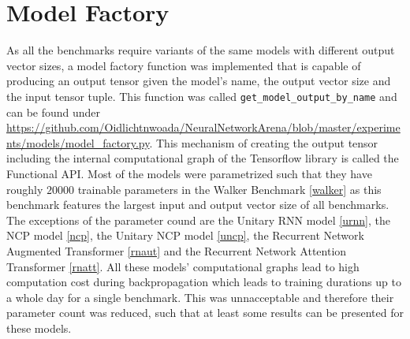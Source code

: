 \documentclass[draft,final]{vutinfth} %
\begin{document}
    \section{Model Factory}
    As all the benchmarks require variants of the same models with different output vector sizes, a model factory function was implemented that is capable of producing an output tensor given the model's name, the output vector size and the input tensor tuple.
    This function was called \texttt{get\_model\_output\_by\_name} and can be found under \url{https://github.com/Oidlichtnwoada/NeuralNetworkArena/blob/master/experiments/models/model_factory.py}.
    This mechanism of creating the output tensor including the internal computational graph of the Tensorflow library \cite{Tensorflow} is called the Functional API.
    Most of the models were parametrized such that they have roughly $20000$ trainable parameters in the Walker Benchmark \ref{walker} as this benchmark features the largest input and output vector size of all benchmarks. 
    The exceptions of the parameter cound are the Unitary RNN model \ref{urnn}, the NCP model \ref{ncp}, the Unitary NCP model \ref{uncp}, the Recurrent Network Augmented Transformer \ref{rnaut} and the Recurrent Network Attention Transformer \ref{rnatt}.
    All these models' computational graphs lead to high computation cost during backpropagation which leads to training durations up to a whole day for a single benchmark. 
    This was unnacceptable and therefore their parameter count was reduced, such that at least some results can be presented for these models.
\end{document}
